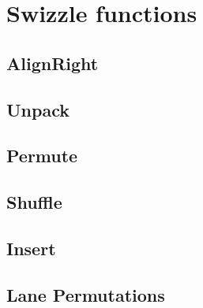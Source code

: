 \section{Swizzle functions}

\subsection{AlignRight}








\subsection{Unpack}
\subsection{Permute}
\subsection{Shuffle}
\subsection{Insert}
\subsection{Lane Permutations}
